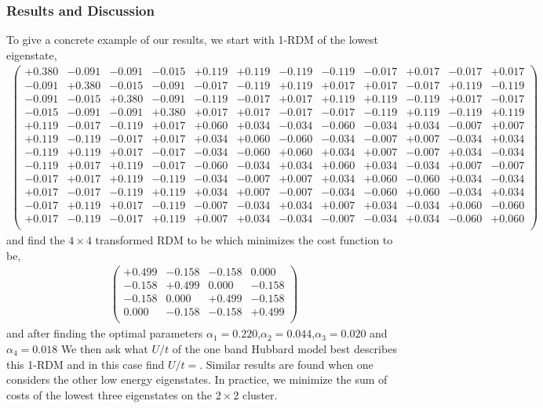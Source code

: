 \documentclass[prl,12pt,onecolumn,nofootinbib,notitlepage,english,superscriptaddress]{revtex4-1}
\begin{document}
\subsubsection{Results and Discussion}
To give a concrete example of our results, we start with 1-RDM of the lowest eigenstate, 
\begin{eqnarray}
\left(
\begin{array}{cccccccccccc}
+0.380	   & -0.091 &-0.091 &-0.015& +0.119& +0.119& -0.119 &-0.119 &-0.017 &+0.017 &-0.017 &+0.017 \\
-0.091	   & +0.380 &-0.015 &-0.091& -0.017& -0.119& +0.119 &+0.017 &+0.017 &-0.017 &+0.119 &-0.119 \\
-0.091	   & -0.015 &+0.380 &-0.091& -0.119& -0.017& +0.017 &+0.119 &+0.119 &-0.119 &+0.017 &-0.017 \\
-0.015	   & -0.091 &-0.091 &+0.380& +0.017& +0.017& -0.017 &-0.017 &-0.119 &+0.119 &-0.119 &+0.119 \\
+0.119	   & -0.017 &-0.119 &+0.017& +0.060& +0.034& -0.034 &-0.060 &-0.034 &+0.034 &-0.007 &+0.007 \\
+0.119	   & -0.119 &-0.017 &+0.017& +0.034& +0.060& -0.060 &-0.034 &-0.007 &+0.007 &-0.034 &+0.034 \\
-0.119	   & +0.119 &+0.017 &-0.017& -0.034& -0.060& +0.060 &+0.034 &+0.007 &-0.007 &+0.034 &-0.034 \\
-0.119	   & +0.017 &+0.119 &-0.017& -0.060& -0.034& +0.034 &+0.060 &+0.034 &-0.034 &+0.007 &-0.007 \\
-0.017	   & +0.017 &+0.119 &-0.119& -0.034& -0.007& +0.007 &+0.034 &+0.060 &-0.060 &+0.034 &-0.034 \\
+0.017	   & -0.017 &-0.119 &+0.119& +0.034& +0.007& -0.007 &-0.034 &-0.060 &+0.060 &-0.034 &+0.034 \\
-0.017	   & +0.119 &+0.017 &-0.119& -0.007& -0.034& +0.034 &+0.007 &+0.034 &-0.034 &+0.060 &-0.060 \\
+0.017	   & -0.119 &-0.017 &+0.119& +0.007& +0.034& -0.034 &-0.007 &-0.034 &+0.034 &-0.060 &+0.060 \\
\end{array}
\right)
\end{eqnarray}
and find the $4\times4$ transformed RDM to be which minimizes the cost function to be, 
\begin{eqnarray}
\left(
\begin{array}{cccc}
+0.499 & -0.158 & -0.158 & 0.000  \\
-0.158 & +0.499 &  0.000 & -0.158 \\
-0.158 &  0.000 & +0.499 & -0.158 \\
 0.000 & -0.158 & -0.158 & +0.499 \\
\end{array}
\right)
\end{eqnarray}
and after finding the optimal parameters $\alpha_1=0.220$,$\alpha_2=0.044$,$\alpha_3=0.020$ and $\alpha_4=0.018$ 
We then ask what $U/t$ of the one band Hubbard model best describes this 1-RDM and in this case find $U/t = $. 
Similar results are found when one considers the other low energy eigenstates. 
In practice, we minimize the sum of costs of the lowest three eigenstates on the $2 \times 2$ cluster.  
 
\end{document}
